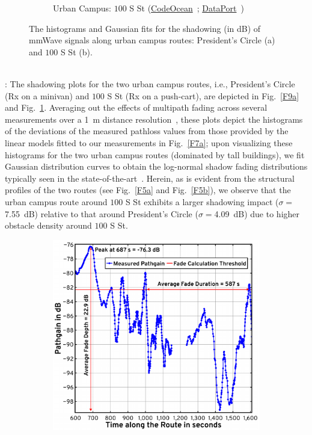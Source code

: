 \documentclass[10pt, twocolumn]{IEEEtran}
\begin{document}
{\begin{figure} [t]
\begin{subfigure}{0.4935\linewidth}
        \caption{Urban Campus: $100$ S St (\href{https://codeocean.com/capsule/9545863/tree}{CodeOcean}~\cite{CodeOcean}; \href{http://ieee-dataport.org/12580}{DataPort}~\cite{DataPort})}
        \label{F9b}
    \end{subfigure}
    \vspace{-5mm}
    \caption{The histograms and Gaussian fits for the shadowing (in dB) of mmWave signals along urban campus routes: President's Circle (a) and $100$ S St (b).}
    \vspace{-4mm}
    \label{F9}
\end{figure}
\\: The shadowing plots for the two urban campus routes, i.e., President's Circle (Rx on a minivan) and $100$ S St (Rx on a push-cart), are depicted in Fig.~\ref{F9a} and Fig.~\ref{F9b}. Averaging out the effects of multipath fading across several measurements over a \SI{1}{\meter} distance resolution~\cite{Averaging_Threshold}, these plots depict the histograms of the deviations of the measured pathloss values from those provided by the linear models fitted to our measurements in Fig.~\ref{F7a}; upon visualizing these histograms for the two urban campus routes (dominated by tall buildings), we fit Gaussian distribution curves to obtain the log-normal shadow fading distributions typically seen in the state-of-the-art~\cite{DopplerHST}. Herein, as is evident from the structural profiles of the two routes (see Fig.~\ref{F5a} and Fig.~\ref{F5b}), we observe that the urban campus route around $100$ S St exhibits a larger shadowing impact ($\sigma{=}$\SI{7.55}{\deci\bel}) relative to that around President's Circle ($\sigma{=}$\SI{4.09}{\deci\bel}) due to higher obstacle density around $100$ S St.
\begin{figure} [t]
    \centering
    \begin{subfigure}{0.5\linewidth}
        \centering
        \includegraphics[width=0.95\linewidth]{figs/urban_campus_pathgain_vs_time_gap_annotated.pdf}

\end{subfigure}
\end{figure}}
\end{document}
